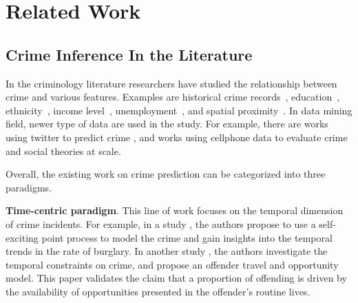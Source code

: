 \chapter{Related Work}




\section{Crime Inference In the Literature}


In the criminology literature researchers have studied the relationship between crime and various features. Examples are historical crime records~\cite{MSBS+12,WRWS13}, education~\cite{Ehrl75}, ethnicity~\cite{Brai89}, income level~\cite{Patt91}, unemployment~\cite{Free99}, and spatial proximity~\cite{Ans02}. 
In data mining field, newer type of data are used in the study. For example, there are works using twitter to predict crime \cite{WGB12,Gerb14}, and works using cellphone data \cite{TQC14,Bogo14} to evaluate crime and social theories at scale. 


Overall, the existing work on crime prediction can be categorized into three paradigms.



\textbf{Time-centric paradigm}. This line of work focuses on the temporal dimension of crime incidents. For example, in a study \cite{MSBS+12}, the authors propose to use a self-exciting point process to model the crime and gain insights into the temporal trends in the rate of burglary. In another study \cite{Ratc06}, the authors investigate the temporal constraints on crime, and propose an offender travel and opportunity model. This paper validates the claim that a proportion of offending is driven by the availability of opportunities presented in the offender's routine lives. 


